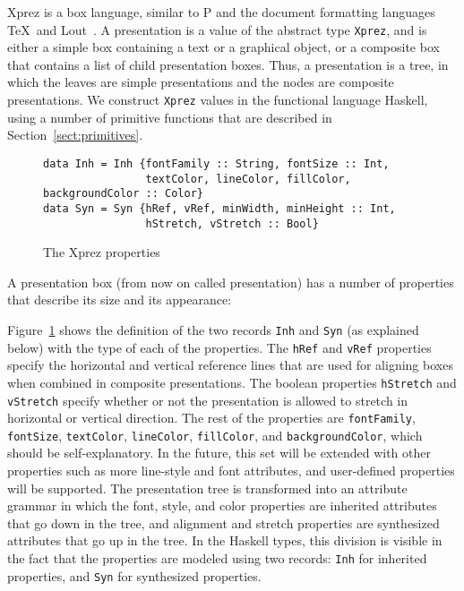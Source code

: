 {\sc Xprez} is a box language, similar to P and the document formatting languages \TeX ~and Lout~\cite{kingston93lout}. A presentation is a value of the abstract type \texttt{Xprez}, and is either a simple box containing a text or a graphical object, or a composite box that contains a list of child presentation boxes. Thus, a presentation is a tree, in which the leaves are simple presentations and the nodes are composite presentations. We construct \texttt{Xprez} values in the functional language Haskell, using a number of primitive functions that are described in Section~\ref{sect:primitives}.

\begin{figure}
\begin{small}
\begin{center}
\begin{small}
\begin{verbatim}
data Inh = Inh {fontFamily :: String, fontSize :: Int,
                textColor, lineColor, fillColor, backgroundColor :: Color} 
data Syn = Syn {hRef, vRef, minWidth, minHeight :: Int,
                hStretch, vStretch :: Bool}
\end{verbatim}
\end{small}
\caption{The {\sc Xprez} properties}\label{xprezproperties} 
\end{center}
\end{small}
\end{figure}


A presentation box (from now on called presentation) has a number of properties that describe its size and its appearance: 

\begin{center}
\end{center}

\toHere

Figure~\ref{xprezproperties} shows the definition of the two records \texttt{Inh} and \texttt{Syn} (as explained below) with the type of each of the properties. The \texttt{hRef} and \texttt{vRef} properties specify the horizontal and vertical reference lines that are used for aligning boxes when combined in composite presentations. The boolean properties \texttt{hStretch} and \texttt{vStretch} specify whether or not the presentation is allowed to stretch in horizontal or vertical direction. The rest of the properties are \texttt{fontFamily}, \texttt{fontSize}, \texttt{textColor}, \texttt{lineColor}, \texttt{fillColor}, and \texttt{backgroundColor}, which should be self-explanatory. In the future, this set will be extended with other properties such as more line-style and font attributes, and user-defined properties will be supported. The presentation tree is transformed into an attribute grammar in which the font, style, and color properties are inherited attributes that go down in the tree, and alignment and stretch properties are synthesized attributes that go up in the tree. In the Haskell types, this division is visible in the fact that the properties are modeled using two records: \texttt{Inh} for inherited properties, and \texttt{Syn} for synthesized properties.


